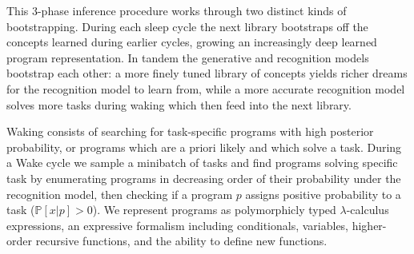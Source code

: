 \documentclass{article}
\DeclareMathOperator*{\argmax}{arg\,max} %
\newcommand{\probability}{\mathds{P}} %
\begin{document}




This 3-phase inference procedure works through two distinct kinds of
bootstrapping.  During each sleep cycle the next library bootstraps
off the concepts learned during earlier cycles, growing an
increasingly deep learned program representation.  In tandem the
generative and recognition models bootstrap each other: a more finely
tuned library of concepts yields richer dreams for the recognition
model to learn from, while a more accurate recognition model solves
more tasks during waking which then feed into the next library.

Waking consists of searching for task-specific programs with high
posterior probability, or programs which are a priori likely and which
solve a task. During a Wake cycle we sample a minibatch of tasks and find programs solving specific task by enumerating
programs in decreasing order of their probability under
the recognition model,  then checking if a program $p$ assigns
positive probability to a task ($\probability[x|p] > 0$). We represent
programs as polymorphicly typed $\lambda$-calculus expressions, an
expressive formalism including conditionals, variables, higher-order
recursive functions, and the ability to define new functions.
\end{document}
